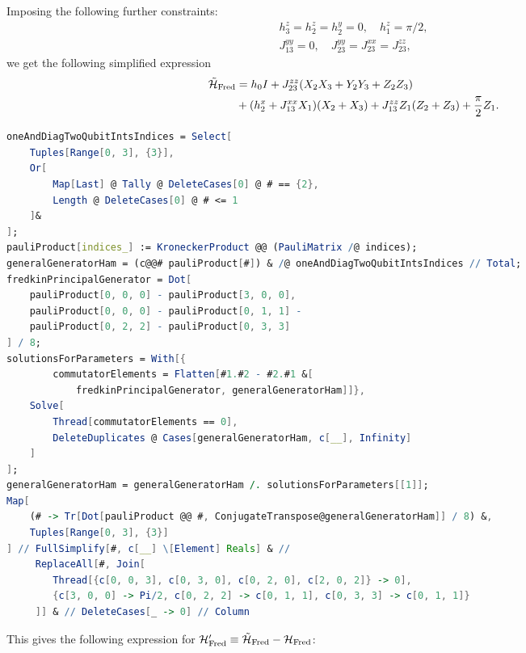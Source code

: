 Imposing the following further constraints:
\begin{equation}
\begin{gathered}
    h_3^z = h_2^z = h_2^y = 0, \quad
    h_1^z = \pi/2, \\
    J_{13}^{yy} = 0,\quad
    J_{23}^{yy} = J_{23}^{xx} = J_{23}^{zz},
\end{gathered}
\end{equation}
we get the following simplified expression
\begin{equation}
\begin{aligned}
    \tilde{{\mathcal{H}}}_{\operatorname{Fred}} &=
    h_0 I
    + J_{23}^{zz} (X_2 X_3 + Y_2 Y_3 + Z_2 Z_3) \\
    &+ (h_2^x + J_{13}^{xx} X_1)(X_2 + X_3)
    + J_{13}^{zz} Z_1 (Z_2 + Z_3)
    + \frac{\pi}{2}  Z_1.
\end{aligned}
\label{eq:GL:fredkin_ansatz_used_for_analytics}
\end{equation}
\begin{lstlisting}[language=Mathematica]
oneAndDiagTwoQubitIntsIndices = Select[
    Tuples[Range[0, 3], {3}],
    Or[
        Map[Last] @ Tally @ DeleteCases[0] @ # == {2},
        Length @ DeleteCases[0] @ # <= 1
    ]&
];
pauliProduct[indices_] := KroneckerProduct @@ (PauliMatrix /@ indices);
generalGeneratorHam = (c@@# pauliProduct[#]) & /@ oneAndDiagTwoQubitIntsIndices // Total;
fredkinPrincipalGenerator = Dot[
    pauliProduct[0, 0, 0] - pauliProduct[3, 0, 0],
    pauliProduct[0, 0, 0] - pauliProduct[0, 1, 1] - 
    pauliProduct[0, 2, 2] - pauliProduct[0, 3, 3]
] / 8;
solutionsForParameters = With[{
        commutatorElements = Flatten[#1.#2 - #2.#1 &[
            fredkinPrincipalGenerator, generalGeneratorHam]]},
    Solve[
        Thread[commutatorElements == 0],
        DeleteDuplicates @ Cases[generalGeneratorHam, c[__], Infinity]
    ]
];
generalGeneratorHam = generalGeneratorHam /. solutionsForParameters[[1]];
Map[
    (# -> Tr[Dot[pauliProduct @@ #, ConjugateTranspose@generalGeneratorHam]] / 8) &, 
    Tuples[Range[0, 3], {3}]
] // FullSimplify[#, c[__] \[Element] Reals] & //
     ReplaceAll[#, Join[
        Thread[{c[0, 0, 3], c[0, 3, 0], c[0, 2, 0], c[2, 0, 2]} -> 0],
        {c[3, 0, 0] -> Pi/2, c[0, 2, 2] -> c[0, 1, 1], c[0, 3, 3] -> c[0, 1, 1]}
     ]] & // DeleteCases[_ -> 0] // Column
\end{lstlisting}
This gives the following expression for ${\mathcal{H}}'_{\operatorname{Fred}}\equiv\tilde{{\mathcal{H}}}_{\operatorname{Fred}}-{\mathcal{H}}_{\operatorname{Fred}}$:
